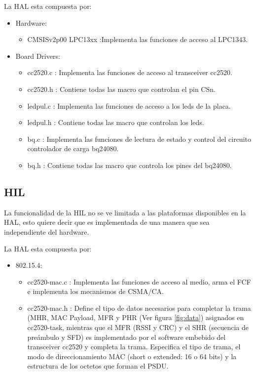 {\noindent La HAL esta compuesta por:
\begin{itemize}
\item Hardware:
	\begin{itemize}
	\item CMSISv2p00 LPC13xx :Implementa las funciones de acceso al LPC1343.	
	\end{itemize}
\item Board Drivers:
	\begin{itemize}
	\item cc2520.c : Implementa las funciones de acceso al transceiver cc2520.
	\item cc2520.h : Contiene todas las macro que controlan el pin CSn.
	\item ledpul.c : Implementa las funciones de acceso a los leds de la placa.
	\item ledpul.h : Contiene todas las macro que controlan los leds.
	\item bq.c : Implementa las funciones de lectura de estado y control del circuito controlador de carga bq24080.
	\item bq.h : Contiene todas las macro que controla los pines del bq24080.
	\end{itemize}
\end{itemize}
		
\subsection{HIL}
\label{subsec:hil}
La funcionalidad de la HIL no se ve limitada a las plataformas disponibles en la HAL, esto quiere decir que es implementada de una manera que sea independiente del hardware.

\noindent La HAL esta compuesta por:
\begin{itemize}
\item 802.15.4:
	\begin{itemize}
	\item cc2520-mac.c : Implementa las funciones de acceso al medio, arma el FCF e implementa los mecanismos de CSMA/CA.
	\item cc2520-mac.h : Define el tipo de datos necesarios para completar la trama (MHR, MAC Payload, MFR y PHR (Ver figura \ref{fig:data}) asignados en cc2520-task, mientras que el MFR (RSSI y CRC) y el SHR (secuencia de preámbulo y SFD) es implementado por el software embebido del transceiver cc2520 y completa la trama. Especifica el tipo de trama, el modo de direccionamiento MAC (short o extended: 16 o 64 bits) y la estructura de los octetos que forman el PSDU.
	\end{itemize}
\end{itemize}

}
